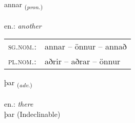 \documentclass[frontgrid, backgrid]{flacards}\usepackage[]{graphicx}\usepackage[]{xcolor}
\begin{document}
\renewcommand{\blhead}{\vskip5pt {\small\bfseries\footnotesize Fornafn | Pronoun }}
\renewcommand{\bcfoot}{\vskip5pt \hspace{2pt}{\small\bfseries\footnotesize 1K}}


{annar \small{\textsubscript{(\textit{pron.})}} \\[1ex] %
\textphonetic{[anar]} \\
en.: \emph{another} \\  [2ex]
\renewcommand*{\arraystretch}{0.8}
\begin{tabular}{ll}
\textsc{sg.nom.}: & annar  --  önnur -- annað \\ 
\textsc{pl.nom.}: & aðrir -- aðrar -- önnur
\end{tabular}
}


\renewcommand{\flhead}{\vskip5pt \fboxsep=0pt {\small\bfseries\footnotesize Atviksorð | Adverb}}
\renewcommand{\fcfoot}{\vskip5pt \fboxsep=0pt \hspace{2pt}{\small\bfseries\footnotesize 1K}}

\renewcommand{\blhead}{\vskip5pt {\small\bfseries\footnotesize Atviksorð | Adverb }}
\renewcommand{\bcfoot}{\vskip5pt \hspace{2pt}{\small\bfseries\footnotesize 1K}}


{þar \small{\textsubscript{(\textit{adv.})}} \\[1ex]
\textphonetic{[θaːr]} \\
en.: \emph{there} \\  [2ex]
þar (Indeclinable)}


\renewcommand{\flhead}{\vskip5pt \fboxsep=0pt {\small\bfseries\footnotesize Forsetning | Preposition}}
\renewcommand{\fcfoot}{\vskip5pt \fboxsep=0pt \hspace{2pt}{\small\bfseries\footnotesize 1K}}

\renewcommand{\blhead}{\vskip5pt {\small\bfseries\footnotesize Forsetning | Preposition }}
\renewcommand{\bcfoot}{\vskip5pt \hspace{2pt}{\small\bfseries\footnotesize 1K}}
\end{document}

